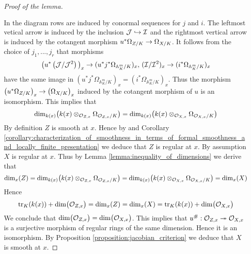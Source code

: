 \begin{proof}[Proof of the lemma]
\begin{center}
\end{center}
In the diagram rows are induced by conormal sequences for $j$ and $i$. The leftmost vetical arrow is induced by the inclusion ${\mathcal J}\hookrightarrow {\mathcal I}$ and the rightmost vertical arrow is induced by the cotangent morphism $u^*\Omega_{Z/K}\rightarrow \Omega_{X/K}$. It follows from the choice of $j_1,...,j_r$ that morphisms
$$\big(u^*\left({\mathcal J}/{\mathcal J}^2\right)\big)_x \rightarrow (u^*j^*\Omega_{\mathbb{A}^m_K / K})_x,\,({\mathcal I}/{\mathcal I}^2)_x \rightarrow (i^*\Omega_{\mathbb{A}^m_K / K})_x$$
have the same image in $(u^*j^*\Omega_{\mathbb{A}^m_K / K})_x = (i^*\Omega_{\mathbb{A}^m_K / K})_x$. Thus the morphism $\left(u^*\Omega_{Z/K}\right)_x \rightarrow \left(\Omega_{X/K}\right)_x$ induced by the cotangent morphism of $u$ is an isomorphism. This implies that
$$\mathrm{dim}_{k(x)}\big(k(x)\otimes_{{\mathcal O}_{Z,x}}\Omega_{{\mathcal O}_{Z,x}/K}\big) = \mathrm{dim}_{k(x)}\big(k(x)\otimes_{{\mathcal O}_{X,x}}\Omega_{{\mathcal O}_{X,x}/K}\big)$$
By definition $Z$ is smooth at $x$. Hence by {\cite[Theorem 6.3]{Formally_smooth_and_unramified}} and Corollary \ref{corollary:characterization_of_smoothness_in_terms_of_formal_smoothness_and_locally_finite_presentation} we deduce that $Z$ is regular at $x$. By assumption $X$ is regular at $x$. Thus by Lemma \ref{lemma:inequality_of_dimensions} we derive that
$$\mathrm{dim}_x(Z) = \mathrm{dim}_{k(x)}\big(k(x)\otimes_{{\mathcal O}_{Z,x}}\Omega_{{\mathcal O}_{Z,x}/K}\big) = \mathrm{dim}_{k(x)}\big(k(x)\otimes_{{\mathcal O}_{X,x}}\Omega_{{\mathcal O}_{X,x}/K}\big) = \mathrm{dim}_x(X)$$
Hence
$$\mathrm{tr}_{K}(k(x)) + \mathrm{dim}\big({\mathcal O}_{Z,x}\big) = \mathrm{dim}_x(Z) = \mathrm{dim}_x(X) = \mathrm{tr}_{K}(k(x)) + \mathrm{dim}\big({\mathcal O}_{X,x}\big)$$
We conclude that $\mathrm{dim}\big({\mathcal O}_{Z,x}\big) = \mathrm{dim}\big({\mathcal O}_{X,x}\big)$. This implies that $u^{\#}:{\mathcal O}_{Z,x}\twoheadrightarrow {\mathcal O}_{X,x}$ is a surjective morphism of regular rings of the same dimension. Hence it is an isomorphism. By Proposition \ref{proposition:jacobian_criterion} we deduce that $X$ is smooth at $x$.
\end{proof}

